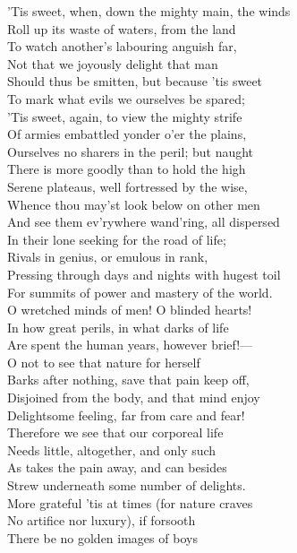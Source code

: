 'Tis sweet, when, down the mighty main, the winds\\
Roll up its waste of waters, from the land\\
To watch another's labouring anguish far,\\
Not that we joyously delight that man\\
Should thus be smitten, but because 'tis sweet\\
To mark what evils we ourselves be spared;\\
'Tis sweet, again, to view the mighty strife\\
Of armies embattled yonder o'er the plains,\\
Ourselves no sharers in the peril; but naught\\
There is more goodly than to hold the high\\
Serene plateaus, well fortressed by the wise,\\
Whence thou may'st look below on other men\\
And see them ev'rywhere wand'ring, all dispersed\\
In their lone seeking for the road of life;\\
Rivals in genius, or emulous in rank,\\
Pressing through days and nights with hugest toil\\
For summits of power and mastery of the world.\\
O wretched minds of men! O blinded hearts!\\
In how great perils, in what darks of life\\
Are spent the human years, however brief!—\\
O not to see that nature for herself\\
Barks after nothing, save that pain keep off,\\
Disjoined from the body, and that mind enjoy\\
Delightsome feeling, far from care and fear!\\
Therefore we see that our corporeal life\\
Needs little, altogether, and only such\\
As takes the pain away, and can besides\\
Strew underneath some number of delights.\\
More grateful 'tis at times (for nature craves\\
No artifice nor luxury), if forsooth\\
There be no golden images of boys\\
